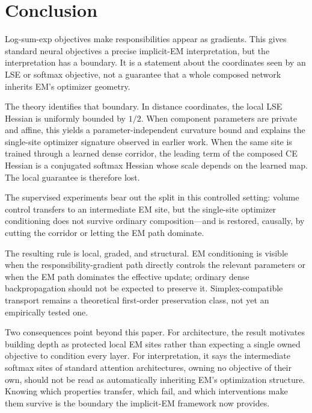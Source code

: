 \section{Conclusion}
\label{sec:conclusion}
Log-sum-exp objectives make responsibilities appear as gradients. This gives
standard neural objectives a precise implicit-EM interpretation, but the
interpretation has a boundary. It is a statement about the coordinates seen by
an LSE or softmax objective, not a guarantee that a whole composed network
inherits EM's optimizer geometry.

The theory identifies that boundary. In distance coordinates, the local LSE
Hessian is uniformly bounded by $1/2$. When component parameters are private
and affine, this yields a parameter-independent curvature bound and explains
the single-site optimizer signature observed in earlier work. When the same
site is trained through a learned dense corridor, the leading term of the
composed CE Hessian is a conjugated softmax Hessian whose scale depends on the
learned map. The local guarantee is therefore lost.

The supervised experiments bear out the split in this controlled setting:
volume control transfers to an intermediate EM site, but the single-site
optimizer conditioning does not survive ordinary composition---and is
restored, causally, by cutting the corridor or letting the EM path dominate.

The resulting rule is local, graded, and structural. EM conditioning is
visible when the responsibility-gradient path directly controls the relevant
parameters or when the EM path dominates the effective update; ordinary dense
backpropagation should not be expected to preserve it. Simplex-compatible
transport remains a theoretical first-order preservation class, not yet an
empirically tested one.

Two consequences point beyond this paper. For architecture, the result
motivates building depth as protected local EM sites rather than expecting a
single owned objective to condition every layer. For interpretation, it says
the intermediate softmax sites of standard attention architectures, owning no
objective of their own, should not be read as automatically inheriting EM's
optimization structure. Knowing which properties transfer, which fail, and
which interventions make them survive is the boundary the implicit-EM
framework now provides.